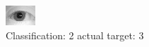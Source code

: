 \begin{figure}[h!]
\begin{center}
\includegraphics[width=0.60\columnwidth]{figures/ID1203_class_2_target_3.png}
\end{center}
\caption{ Classification: 2 actual target: 3}
\label{fig:ID1203_class_2_target_3}
\end{figure}
